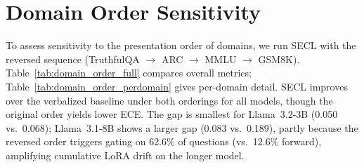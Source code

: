 \section{Domain Order Sensitivity} \label{app:domain_order}

To assess sensitivity to the presentation order of domains, we run SECL 
with the reversed sequence 
(TruthfulQA $\to$ ARC $\to$ MMLU $\to$ GSM8K).
Table~\ref{tab:domain_order_full} compares overall metrics; 
Table~\ref{tab:domain_order_perdomain} gives per-domain detail.
SECL improves over the verbalized baseline under both orderings for all models,
though the original order yields lower ECE.
The gap is smallest for Llama~3.2-3B (0.050 vs.\ 0.068); Llama~3.1-8B shows
a larger gap (0.083 vs.\ 0.189), partly because the reversed order triggers
gating on 62.6\% of questions (vs.\ 12.6\% forward), amplifying cumulative
LoRA drift on the longer model.

\begin{table}[htbp]
\centering
\small
{}%
\caption{Domain order sensitivity (overall metrics).
$\mathcal{O}$: GSM8K$\to$MMLU$\to$ARC$\to$TruthfulQA.
$\mathcal{R}$: TruthfulQA$\to$ARC$\to$MMLU$\to$GSM8K.}
\label{tab:domain_order_full}
\end{table}

